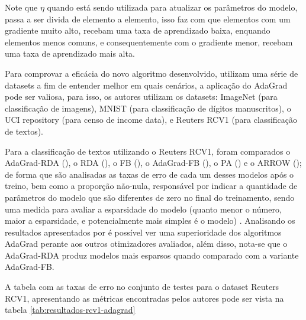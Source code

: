 Note que $\eta$ quando está sendo utilizada para atualizar os parâmetros do modelo, passa a ser divida de elemento a elemento, isso faz com que elementos com um gradiente muito alto, recebam uma taxa de aprendizado baixa, enquando elementos menos comuns, e consequentemente com o gradiente menor, recebam uma taxa de aprendizado mais alta. 

Para comprovar a eficácia do novo algoritmo desenvolvido, \textcite{AdaGradMethod} utilizam uma série de datasets a fim de entender melhor em quais cenários, a aplicação do AdaGrad pode ser valiosa, para isso, os autores utilizam os datasets: ImageNet (para classificação de imagens), MNIST (para classificação de dígitos manuscritos), o UCI repository (para censo de income data), e Reuters RCV1 (para classificação de textos).

Para a classificação de textos utilizando o Reuters RCV1, foram comparados o AdaGrad-RDA (), o RDA (), o FB (), o AdaGrad-FB (), o PA () e o ARROW (); de forma que são analisadas as taxas de erro de cada um desses modelos após o treino, bem como a proporção não-nula, responsável por indicar a quantidade de parâmetros do modelo que são diferentes de zero no final do treinamento, sendo uma medida para avaliar a esparsidade do modelo (quanto menor o número, maior a esparsidade, e potencialmente mais simples é o modelo) \parencite{AdaGradMethod}. Analisando os resultados apresentados por \textcite{AdaGradMethod} é possível ver uma superioridade dos algoritmos AdaGrad perante aos outros otimizadores avaliados, além disso, nota-se que o AdaGrad-RDA produz modelos mais esparsos quando comparado com a variante AdaGrad-FB.

A tabela com as taxas de erro no conjunto de testes para o dataset Reuters RCV1, apresentando as métricas encontradas pelos autores pode ser vista na tabela \ref{tab:resultados-rcv1-adagrad}

